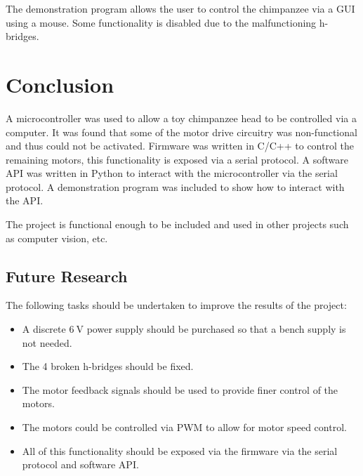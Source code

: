 \documentclass[11pt]{article} %
\begin{document}
The demonstration program allows the user to control the chimpanzee via a GUI using a mouse. Some functionality is disabled due to the malfunctioning h-bridges.

\section{Conclusion}

A microcontroller was used to allow a toy chimpanzee head to be controlled via a computer.
It was found that some of the motor drive circuitry was non-functional and thus could not be activated.
Firmware was written in C/C++ to control the remaining motors, this functionality is exposed via a serial protocol.
A software API was written in Python to interact with the microcontroller via the serial protocol.
A demonstration program was included to show how to interact with the API.

The project is functional enough to be included and used in other projects such as computer vision, etc.

\subsection{Future Research}

The following tasks should be undertaken to improve the results of the project:
\begin{itemize}
	\item A discrete $\SI{6}{\volt}$ power supply should be purchased so that a bench supply is not needed.
	\item The 4 broken h-bridges should be fixed.
	\item The motor feedback signals should be used to provide finer control of the motors.
	\item The motors could be controlled via PWM to allow for motor speed control.
	\item All of this functionality should be exposed via the firmware via the serial protocol and software API.
\end{itemize}
\end{document}
